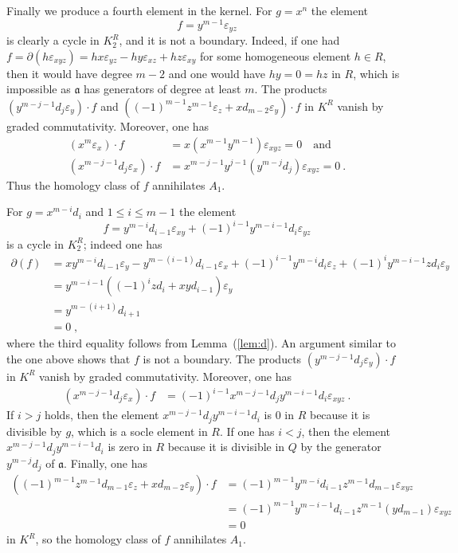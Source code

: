 \documentclass{amsart}
\theoremstyle{bfupright head,upright body}
\theoremstyle{fixed bf head,slanted body}
\theoremstyle{fixed bf head,upright body}
\theoremstyle{numbered paragraph}
\newenvironment{prf*}[1][Proof]{%
  \begin{proof}[\bf #1]
    \setcounter{equation}{0}
    \renewcommand{\theequation}{\arabic{equation}}}
  {\end{proof}
}
\newcommand{\pgref}[1]{(\ref{#1})}
\newcommand{\lemref}[2][Lemma~]{#1\pgref{lem:#2}}
\newcommand{\qtext}[1]{\quad\text{#1}\quad}
\newcommand{\qand}{\qtext{and}}
\newcommand{\e}[1]{\varepsilon_{#1}}
\newcommand{\fa}{\mathfrak{a}}
\numberwithin{equation}{res}
\begin{document}
\begin{prf*}
  Finally we produce a fourth element in the kernel.  For $g=x^n$ the
  element
  \begin{equation*}
    f=y^{m-1}\e{yz}
  \end{equation*}
  is clearly a cycle in $K^R_2$, and it is not a boundary. Indeed, if
  one had $f = \partial(h\e{xyz}) = hx\e{yz} -hy\e{xz} + hz\e{xy}$ for
  some homogeneous element $h\in R$, then it would have degree $m-2$
  and one would have $hy=0=hz$ in $R$, which is impossible as $\fa$
  has generators of degree at least $m$. The products
  $(y^{m-j-1}d_j\e{y})\cdot f$ and $((-1)^{m-1}z^{m-1}\e{z} +
  xd_{m-2}\e{y})\cdot f$ in $K^R$ vanish by graded
  commutativity. Moreover, one has
  \begin{align*}
    (x^m\e{x})\cdot f &= x(x^{m-1}y^{m-1})\e{xyz} = 0\qand\\
    (x^{m-j-1}d_j\e{x})\cdot f &= x^{m-j-1}y^{j-1}(y^{m-j}d_j)\e{xyz}
    = 0\:.
  \end{align*}
  Thus the homology class of $f$ annihilates $A_1$.

  For $g=x^{m-i}d_i$ and $1 \le i \le m-1$ the element
  \begin{equation*}
    f = y^{m-i}d_{i-1}\e{xy} + (-1)^{i-1}y^{m-i-1}d_i\e{yz}
  \end{equation*}
  is a cycle in $K^R_2$; indeed one has
  \begin{align*}
    \partial(f) & = xy^{m-i}d_{i-1}\e{y} - y^{m-(i-1)}d_{i-1}\e{x} +
    (-1)^{i-1}y^{m-i}d_i\e{z} + (-1)^{i}y^{m-i-1}zd_i\e{y}\\
    &= y^{m-i-1}((-1)^{i}zd_i + xyd_{i-1})\e{y}\\
    &= y^{m-(i+1)}d_{i+1}\\
    &=0\;,
  \end{align*}
  where the third equality follows from \lemref{d}.  An argument
  similar to the one above shows that $f$ is not a boundary.  The
  products $(y^{m-j-1}d_j\e{y})\cdot f$ in $K^R$ vanish by graded
  commutativity. Moreover, one has
  \begin{align*}
    (x^{m-j-1}d_j\e{x})\cdot f &=
    (-1)^{i-1}x^{m-j-1}d_jy^{m-i-1}d_i\e{xyz}\:.
  \end{align*}
  If $i > j$ holds, then the element $x^{m-j-1}d_jy^{m-i-1}d_i$ is $0$
  in $R$ because it is divisible by $g$, which is a socle element in
  $R$. If one has $i < j$, then the element $x^{m-j-1}d_jy^{m-i-1}d_i$
  is zero in $R$ because it is divisible in $Q$ by the generator
  $y^{m-j}d_j$ of $\fa$. Finally, one has
  \begin{align*}
    ((-1)^{m-1}z^{m-1}d_{m-1}\e{z} + xd_{m-2}\e{y})\cdot f
    &= (-1)^{m-1}y^{m-i}d_{i-1}z^{m-1}d_{m-1}\e{xyz}\\
    &= (-1)^{m-1}y^{m-i-1}d_{i-1}z^{m-1}(yd_{m-1})\e{xyz}\\
    &= 0
  \end{align*}
  in $K^R$, so the homology class of $f$ annihilates $A_1$.


\end{prf*}
\end{document}

